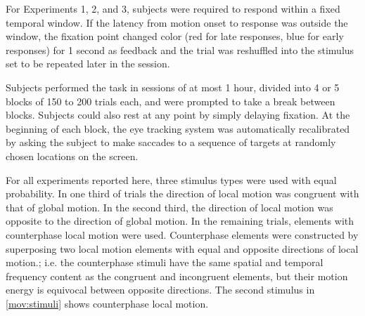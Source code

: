 \documentclass[manuscript]{subfiles}
\begin{document}
For Experiments 1, 2, and 3, subjects were required to respond within a fixed temporal window. If the latency from motion onset to response was outside the window, the fixation point changed color (red for late responses, blue for early responses) for 1 second as feedback and the trial was reshuffled into the stimulus set to be repeated later in the session.


Subjects performed the task in sessions of at most 1 hour, divided into 4 or 5 blocks of 150 to 200 trials each, and were prompted to take a break between blocks. Subjects could also rest at any point by simply delaying fixation. At the beginning of each block, the eye tracking system was automatically recalibrated by asking the subject to make saccades to a sequence of targets at randomly chosen locations on the screen.

For all experiments reported here, three stimulus types were used with equal probability. In one third of trials the direction of local motion was congruent with that of global motion. In the second third, the direction of local motion was opposite to the direction of global motion. In the remaining trials, elements with counterphase local motion were used. Counterphase elements were constructed by superposing two local motion elements with equal and opposite directions of local motion.; i.e. the counterphase stimuli have the same spatial and temporal frequency content as the congruent and incongruent elements, but their motion energy is equivocal between opposite directions. The second stimulus in \autoref{mov:stimuli} shows counterphase local motion.

\biblio
\end{document}
